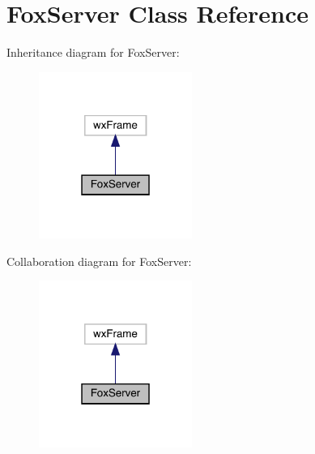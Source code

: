\hypertarget{class_fox_server}{}\section{Fox\+Server Class Reference}
\label{class_fox_server}


Inheritance diagram for Fox\+Server\+:
\nopagebreak
\begin{figure}[H]
\begin{center}
\leavevmode
\includegraphics[width=142pt]{class_fox_server__inherit__graph}
\end{center}
\end{figure}


Collaboration diagram for Fox\+Server\+:
\nopagebreak
\begin{figure}[H]
\begin{center}
\leavevmode
\includegraphics[width=142pt]{class_fox_server__coll__graph}
\end{center}
\end{figure}
